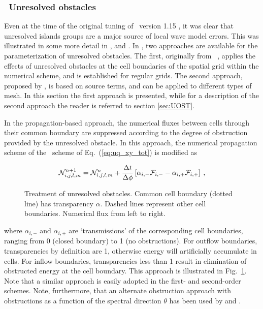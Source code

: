 \vsssub
\subsubsection{~Unresolved obstacles} \label{sub:num_obst}

\noindent
Even at the time of the original tuning of \ws\ version 1.15
\citep{tol:OMB02a}, it was clear that unresolved islands groups are a major
source of local wave model errors. This was illustrated in some more detail in
\citet[][Fig.~3]{tol:Waves01a}, and \citet[][Fig.~8]{tol:WaF02}. 
In \ws, two approaches are available for the parameterization
of unresolved obstacles. The first, originally from \swan\ \citep{art:BRH99,man:SWAN3},
applies the effects of unresolved obstacles at the cell boundaries of the spatial grid
within the numerical scheme, and is established for regular grids. 
The second approach, proposed by \citep{art:Mentaschi2015b}, is based on source terms,
and can be applied to different types of mesh.
In this section the first approach is presented, while for a description of the
second approach the reader is referred to section \ref{sec:UOST}.

In the propagation-based approach, the numerical fluxes between
cells through their common boundary are suppressed according to the degree of
obstruction provided by the unresolved obstacle. In this approach, the
numerical propagation scheme of the \uq\ scheme of Eq.~(\ref{eq:uq_xy_tot}) is
modified as


\begin{equation}
\cN_{i,j,l,m}^{n+1} = \cN_{i,j,l,m}^n +
\frac{\Delta t}{\Delta \phi} \left [ \alpha_{i,-} \cF_{i,-} - \alpha_{i,+} \cF_{i,+} \right ]
\: , \label{eq:uq_xy_obstr} \end{equation}

\begin{figure} \begin{center}
\caption{Treatment of unresolved obstacles. Common cell
         boundary (dotted line) has transparency $\alpha$. Dashed lines
         represent other cell boundaries. Numerical flux from left to right.}
         \label{fig:obstr} \botline
\end{center}
\end{figure}

\noindent
where $\alpha_{i,-}$ and $\alpha_{i,+}$ are `transmissions' of the
corresponding cell boundaries, ranging from 0 (closed boundary) to 1 (no
obstructions). For outflow boundaries, transparencies by definition are 1,
otherwise energy will artificially accumulate in cells. For inflow boundaries,
transparencies less than 1 result in elimination of obstructed energy at the
cell boundary. This approach is illustrated in
Fig.~\ref{fig:obstr}. Note that a similar approach is easily adopted in the
first- and second-order schemes.  Note, furthermore, that an alternate
obstruction approach with obstructions as a function of the spectral direction
$\theta$ has been used by \cite{art:HY96} and \cite{art:HMM00}.

